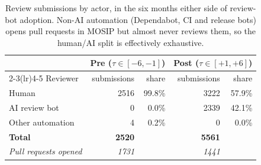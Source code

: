 \begin{table}[htbp]
\centering
\caption{Review submissions by actor, in the six months either side of
review-bot adoption. Non-AI automation (Dependabot, CI and release bots) opens
pull requests in MOSIP but almost never reviews them, so the human/AI split is
effectively exhaustive.}
\label{tab:review-actors}
\small
\begin{tabular}{@{}lrrrr@{}}
\toprule
 & \multicolumn{2}{c}{Pre ($\tau \in [-6,-1]$)} & \multicolumn{2}{c}{Post ($\tau \in [+1,+6]$)} \\
\cmidrule(lr){2-3}\cmidrule(lr){4-5}
Reviewer & submissions & share & submissions & share \\
\midrule
Human              & 2516 & 99.8\% & 3222 & 57.9\% \\
AI review bot      &    0 &  0.0\% & 2339 & 42.1\% \\
Other automation   &    4 &  0.2\% &    0 &  0.0\% \\
\midrule
\textbf{Total}     & \textbf{2520} & & \textbf{5561} & \\
\textit{Pull requests opened} & \textit{1731} & & \textit{1441} & \\
\bottomrule
\end{tabular}
\end{table}
